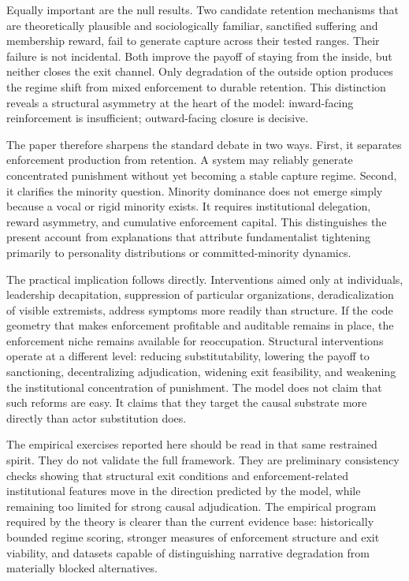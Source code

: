 \documentclass[12pt]{article}
\begin{document}
Equally important are the null results. Two candidate retention mechanisms that are theoretically plausible and sociologically familiar, sanctified suffering and membership reward, fail to generate capture across their tested ranges. Their failure is not incidental. Both improve the payoff of staying from the inside, but neither closes the exit channel. Only degradation of the outside option produces the regime shift from mixed enforcement to durable retention. This distinction reveals a structural asymmetry at the heart of the model: inward-facing reinforcement is insufficient; outward-facing closure is decisive.

The paper therefore sharpens the standard debate in two ways. First, it separates enforcement production from retention. A system may reliably generate concentrated punishment without yet becoming a stable capture regime. Second, it clarifies the minority question. Minority dominance does not emerge simply because a vocal or rigid minority exists. It requires institutional delegation, reward asymmetry, and cumulative enforcement capital. This distinguishes the present account from explanations that attribute fundamentalist tightening primarily to personality distributions or committed-minority dynamics.

The practical implication follows directly. Interventions aimed only at individuals, leadership decapitation, suppression of particular organizations, deradicalization of visible extremists, address symptoms more readily than structure. If the code geometry that makes enforcement profitable and auditable remains in place, the enforcement niche remains available for reoccupation. Structural interventions operate at a different level: reducing substitutability, lowering the payoff to sanctioning, decentralizing adjudication, widening exit feasibility, and weakening the institutional concentration of punishment. The model does not claim that such reforms are easy. It claims that they target the causal substrate more directly than actor substitution does.

The empirical exercises reported here should be read in that same restrained spirit. They do not validate the full framework. They are preliminary consistency checks showing that structural exit conditions and enforcement-related institutional features move in the direction predicted by the model, while remaining too limited for strong causal adjudication. The empirical program required by the theory is clearer than the current evidence base: historically bounded regime scoring, stronger measures of enforcement structure and exit viability, and datasets capable of distinguishing narrative degradation from materially blocked alternatives.
\end{document}
